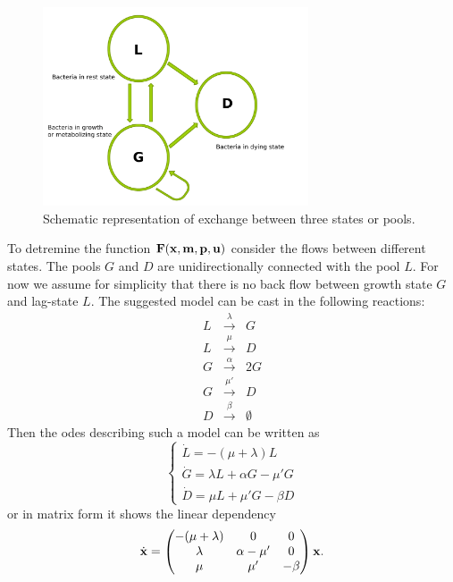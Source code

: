 \documentclass[10pt,A4paper]{article}
\begin{document}
\begin{figure}[t]
    \begin{center}
    \includegraphics[width=0.7\textwidth]{Figures/TPM_fig.pdf}
    \caption{{\footnotesize Schematic representation of exchange between three states or pools.}}
    \label{fig:SchematicRep}
    \end{center}
\end{figure}
To detremine the function $\mathbf{F}(\mathbf{x}, \mathbf{m}, \mathbf{p}, \mathbf{u})$ consider the flows between different states.
The pools $G$ and $D$ are unidirectionally connected with the pool $L$. 
For now we assume for simplicity that there is no back flow between growth state $G$ and lag-state $L$. 
The suggested model can be cast in the following reactions: 
\begin{eqnarray}
    L &\stackrel{\lambda}{\longrightarrow} & G\\
    L &\stackrel{\mu}{\longrightarrow} & D\\
    G &\stackrel{\alpha}{\longrightarrow} & 2G\\
    G &\stackrel{\mu'}{\longrightarrow} & D\\
    D &\stackrel{\beta}{\longrightarrow} & \emptyset
\end{eqnarray}
Then the \acp{ode} describing such a model can be written as 
\begin{equation}
\begin{cases}
    \dot{L} = -(\mu + \lambda) L\\
    \dot{G} = \lambda L + \alpha G - \mu' G\\
    \dot{D} = \mu  L + \mu' G- \beta D  
\end{cases}
\end{equation}
or in matrix form it shows the linear dependency
\begin{equation}
    \dot {\mathbf{x}}  = \begin{pmatrix}
        -(\mu + \lambda) & 0             & 0      \\
        \lambda          & \alpha - \mu' & 0      \\
        \mu              & \mu'          & -\beta 
    \end{pmatrix} \mathbf{x} .
\end{equation}
%
%
\end{document}
